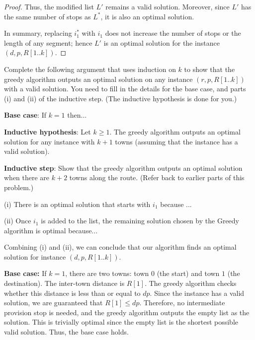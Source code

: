 \documentclass[11pt,fleqn]{exam}
\newenvironment{soln}{\color{solnblue}}{}
\newif\ifsolutions\solutionsfalse
\begin{document}
\begin{questions}
\begin{soln}
\begin{proof}
   Thus, the modified list \( L' \) remains a valid solution. Moreover, since \( L' \) 
   has the same number of stops as \( L^* \), it is also an optimal solution.
   
   In summary, replacing \( i_1^* \) with \( i_1 \) does not increase the number of stops or the 
   length of any segment; hence \( L' \) is an optimal solution for the instance \((d,p,R[1..k])\).
   \end{proof}
\end{soln}
   

\ifsolutions

\fi

\question[3]
Complete the following argument that uses induction on $k$ to show that the greedy algorithm
outputs an optimal solution
 on any instance $(r,p,R[1..k])$ with a valid solution. You need to fill in the details for 
the base case, and parts (i) and (ii) of the inductive step. (The inductive hypothesis is done for you.)

\vspace{.1in}

\noindent
{\bf Base case}: If $k = 1$ then...

\ifsolutions

\fi

\noindent
{\bf Inductive hypothesis}: Let $k\ge 1$.
The greedy algorithm outputs an optimal solution for any instance with $k+1$ towns (assuming that the instance has a valid solution).

\noindent
{\bf Inductive step}: Show that the greedy algorithm outputs an optimal
solution when there are $k+2$ towns along the route. (Refer back to earlier parts of this problem.)

(i) There is an optimal solution that starts with $i_1$ because ...

\ifsolutions
\begin{soln}
...the solution $L'$ constructed in part 4 is such a solution.
\end{soln}
\fi

(ii) Once $i_1$ is added to the list, the remaining solution chosen by the Greedy algorithm is optimal because...

\ifsolutions

\fi

\vspace{.1in}

Combining (i) and (ii), we can conclude that our algorithm finds an optimal solution for instance
$(d,p,R[1..k])$.

\begin{soln}
   \noindent
   \textbf{Base case:}  
   If \( k = 1 \), there are two towns: town \( 0 \) (the start) and town \( 1 \) (the destination). The inter-town distance is \( R[1] \).  
   The greedy algorithm checks whether this distance is less than or equal to \( dp \). Since the instance has a valid solution, we are guaranteed that \( R[1] \le dp \). Therefore, no intermediate provision stop is needed, and the greedy algorithm outputs the empty list as the solution. This is trivially optimal since the empty list is the shortest possible valid solution. Thus, the base case holds.
   

\end{soln}
\end{questions}
\end{document}

